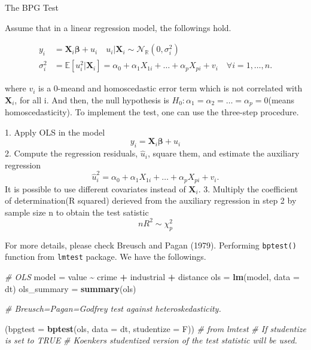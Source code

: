 \documentclass[
  12pt,
]{article}
\newenvironment{Shaded}{\begin{snugshade}}{\end{snugshade}}
\newcommand{\CommentTok}[1]{\textcolor[rgb]{0.56,0.35,0.01}{\textit{#1}}}
\newcommand{\DataTypeTok}[1]{\textcolor[rgb]{0.13,0.29,0.53}{#1}}
\newcommand{\KeywordTok}[1]{\textcolor[rgb]{0.13,0.29,0.53}{\textbf{#1}}}
\newcommand{\NormalTok}[1]{#1}
\newcommand{\OperatorTok}[1]{\textcolor[rgb]{0.81,0.36,0.00}{\textbf{#1}}}
\newcommand{\StringTok}[1]{\textcolor[rgb]{0.31,0.60,0.02}{#1}}
\begin{document}
\begin{itembox}[1]{The BPG Test}

Assume that in a linear regression model, the followings hold.

\begin{align*}
        y_i & = \mathbf{X}_i \mathbf{\beta} + u_i \quad u_i|\mathbf{X}_i \sim \mathcal{N}_{\mathbb{R}}(0, \sigma^2_i) \\
        \sigma^2_i & = \mathbb{E}[u_i^2|\mathbf{X}_i] = \alpha_0 + \alpha_1 X_{1i} + \dots + \alpha_{p} X_{pi}  + v_i \quad \forall i = 1, \dots, n.
\end{align*}

where $v_i$ is a 0-meand and homoscedastic error term which is not correlated with $\mathbf{X}_i$, for all i.
And then, the null hypothesis is $H_0 : \alpha_1 = \alpha_2 = \dots = \alpha_p = 0$(means homoscedasticity). To implement the test, one can use the three-step procedure.

1. Apply OLS in the model $$y_i  = \mathbf{X}_i \mathbf{\beta} + u_i$$
2. Compute the regression residuals, $\hat{u}_i$, square them, and estimate the auxiliary regression $$\hat{u}_i^2 = \alpha_0 + \alpha_1 X_{1i} + \dots + \alpha_{p} X_{pi}  + v_i.$$ It is possible to use different covariates instead of $\mathbf{X}_i$.
3. Multiply the coefficient of determination(R squared) derieved from the auxiliary regression in step 2 by sample size n to obtain the test satistic $$n R^2 \sim \chi^2_{p}$$

\end{itembox}

For more details, please check Breusch and Pagan (1979).
Performing \texttt{bptest()} function from \texttt{lmtest} package. We have the followings.

\begin{Shaded}
\begin{Highlighting}[]
\CommentTok{\# OLS}
\NormalTok{model =}\StringTok{ }\NormalTok{value }\OperatorTok{\textasciitilde{}}\StringTok{ }\NormalTok{crime }\OperatorTok{+}\StringTok{ }\NormalTok{industrial }\OperatorTok{+}\StringTok{ }\NormalTok{distance}
\NormalTok{ols =}\StringTok{ }\KeywordTok{lm}\NormalTok{(model, }\DataTypeTok{data =}\NormalTok{ dt)}
\NormalTok{ols\_summary =}\StringTok{ }\KeywordTok{summary}\NormalTok{(ols)}

\CommentTok{\# Breusch=Pagan=Godfrey test against heteroskedasticity.}

\NormalTok{(}\DataTypeTok{bpgtest =} \KeywordTok{bptest}\NormalTok{(ols, }\DataTypeTok{data =}\NormalTok{ dt, }\DataTypeTok{studentize =}\NormalTok{ F)) }\CommentTok{\# from lmtest}
\CommentTok{\# If studentize is set to TRUE }
\CommentTok{\# Koenker\textquotesingle{}s studentized version of the test statistic will be used.}
\end{Highlighting}
\end{Shaded}
\end{document}
